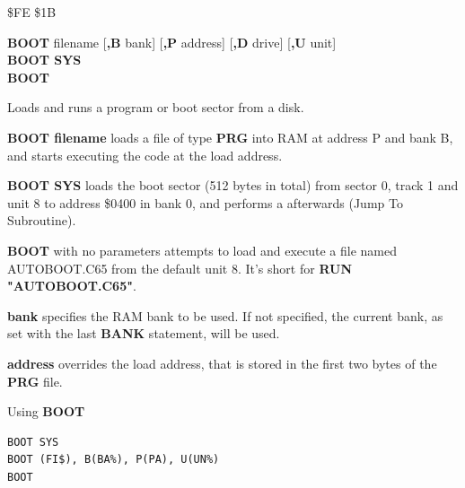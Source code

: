 \begin{description}[leftmargin=2cm,style=nextline]
\item [Token:] \$FE \$1B
\item [Format:] {\bf BOOT} filename [{\bf,B} bank]
                [{\bf,P} address]  [{\bf,D} drive] [{\bf,U} unit]\\
                {\bf BOOT SYS} \\
                {\bf BOOT}
\item [Usage:]
   Loads and runs a program or boot sector from a disk.

   {\bf BOOT filename} loads a file of type
   {\bf PRG} into RAM at address P and bank B, and starts executing
   the code at the load address.

   {\bf BOOT SYS} loads the boot sector (512 bytes in total) from sector 0,
   track 1 and unit 8 to address \$0400 in bank 0, and
   performs a  afterwards (Jump To Subroutine).

   {\bf BOOT} with no parameters attempts to load
   and execute a file named AUTOBOOT.C65 from the default unit 8.
   It's short for {\bf RUN "AUTOBOOT.C65"}.

   \filenamedefinition

   {\bf bank} specifies the RAM bank to be used.
   If not specified, the current bank, as set with the last
   {\bf BANK} statement, will be used.

   {\bf address} overrides the load address,
   that is stored in the first two bytes of the {\bf PRG} file.

   \drivedefinition

   \unitdefinition

\item [Examples:] Using {\bf BOOT}
\begin{tcolorbox}[colback=black,coltext=white]
\verbatimfont{\codefont}
\begin{verbatim}
BOOT SYS
BOOT (FI$), B(BA%), P(PA), U(UN%)
BOOT
\end{verbatim}
\end{tcolorbox}
\end{description}

